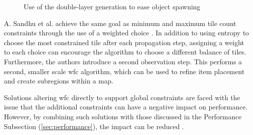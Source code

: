 \begin{figure}[H]
    \centering
    \hfill
    \caption{Use of the double-layer generation to ease object spawning \cite{WFC_Automatic_Rules_And_Better_Symmetries}}
    \label{fig:wfcMultiLayer}
\end{figure}

A. Sandhu et al. achieve the same goal as minimum and maximum tile count constraints through the use of a weighted choice \cite{WFC_Design_Constraints}. In addition to using entropy to choose the most constrained tile after each propagation step, assigning a weight to each choice can encourage the algorithm to choose a different balance of tiles. Furthermore, the authors introduce a second observation step. This performs a second, smaller scale \acrshort{wfc} algorithm, which can be used to refine item placement and create subregions within a map.

Solutions altering \acrshort{wfc} directly to support global constraints are faced with the issue that the additional constraints can have a negative impact on performance. However, by combining such solutions with those discussed in the Performance Subsection (\ref{sec:performance}), the impact can be reduced \cite{WFC_ConstraintSolving_and_ML}.

